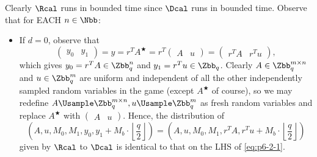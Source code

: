 \begin{answer}[ii]
    Clearly $\Rcal$ runs in bounded time since $\Dcal$ runs in bounded time. Observe that for EACH $n\in\Nbb$:
    \begin{itemize}
        \item If $d=0$, observe that
        \[
            \left(\begin{array}{c|c}
                 y_0 & y_1
            \end{array}\right)
            = y = r^TA^\bigstar = r^T \left(\begin{array}{c|c}
                 A & u
            \end{array}\right)
            = \left(\begin{array}{c|c}
                 r^TA & r^Tu
            \end{array}\right),
        \]
        which gives $y_0= r^TA \in\Zbb_q^n$ and  $y_1= r^Tu\in\Zbb_q$. 
        Clearly $A\in \Zbb_q^{m\times n}$ and $u\in \Zbb_q^{m}$ are uniform and independent of all the other independently sampled random variables in the game (except $A^\bigstar$ of course), so we may redefine $A\Usample\Zbb_q^{m\times n}, u\Usample \Zbb_q^{m}$ as fresh random variables and replace $A^\bigstar$ with $\left(\begin{array}{c|c}A & u\end{array}\right)$.
        Hence, the distribution of 
        \[
            \left(A, u, M_0, M_1, y_0, y_1 + M_b \cdot \left\lfloor\frac{q}{2}\right\rfloor\right)
            =\left(A, u, M_0, M_1, r^TA, r^Tu + M_b \cdot \left\lfloor\frac{q}{2}\right\rfloor\right)
        \] 
        given by $\Rcal$ to $\Dcal$ is identical to that on the LHS of \eqref{eq:p6-2-1}.
        

\end{itemize}
\end{answer}
